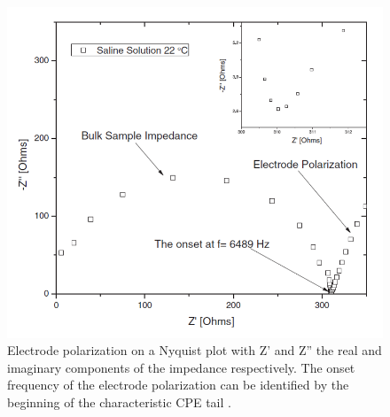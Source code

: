 \begin{figure}[h]
    \centering
    \includegraphics[width=\textwidth]{images/nyquist_ep_onset.png}
    \caption[Electrode polarization on a Nyquist plot]{Electrode polarization on a Nyquist plot with Z' and Z'' the real and imaginary components of the impedance respectively. The onset frequency of the electrode polarization can be identified by the beginning of the characteristic CPE tail \cite{ishai_assessment_2012}.}
    \label{fig:nyquist_onset}
\end{figure}


 
 
